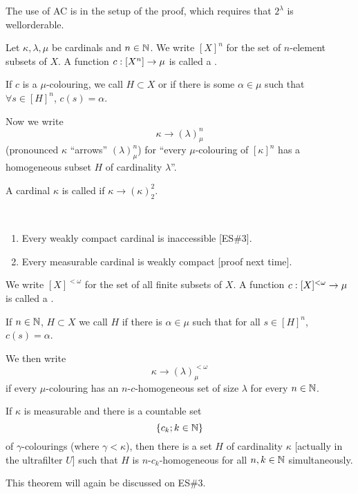 \documentclass[]{article}
\newcommand{\lom}{{<\omega}}
\begin{document}
\begin{remark*}
    The use of AC is in the setup of the proof, which requires that $2^\lambda$ is wellorderable.
\end{remark*}

\begin{defin*}
    Let $\kappa,\lambda,\mu$ be cardinals and $n \in \mathbb{N}$. We write $[X]^n$ for the set of $n$-element subsets of $X$. A function $c : [X^n] \rightarrow \mu$ is called a .

    If $c$ is a $\mu$-colouring, we call $H\subset X$  or  if there is some $ \alpha \in \mu$ such that $\forall s \in [H]^n$, $c(s) = \alpha$.

    Now we write $$\kappa \rightarrow (\lambda)^n_\mu$$ (pronounced $\kappa$ ``arrows'' $(\lambda)^n_\mu$) for ``every $\mu$-colouring of $[\kappa]^n$ has a homogeneous subset $H$ of cardinality $\lambda$''.
\end{defin*}

\begin{defin*}
    A cardinal $\kappa$ is called  if $\kappa \rightarrow (\kappa)^2_2$.
\end{defin*}
\begin{remark*}[Facts]\ 
    \begin{enumerate}[label = (\arabic*)]
        \item Every weakly compact cardinal is inaccessible [ES\#3].
        \item Every measurable cardinal is weakly compact [proof next time].
    \end{enumerate}
\end{remark*}

\begin{defin*}
    We write $[X]^\lom$ for the set of all finite subsets of $X$. A function $c : [X]^\lom \ra\mu$ is called a .

    If $n \in \mathbb{N}$, $H\subset X$ we call $H$  if there is $\alpha \in \mu$ such that for all $s \in [H]^n$, $c(s) = \alpha$.

    We then write $$\kappa \rightarrow (\lambda)^\lom_\mu$$ if every $\mu$-colouring has an $n$-$c$-homogeneous set of size $\lambda$ for every $n \in \mathbb{N}$.
\end{defin*}

\begin{theorem*}
    If $\kappa$ is measurable and there is a countable set $$\{c_k;k \in \mathbb{N}\}$$ of $\gamma$-colourings (where $\gamma < \kappa$), then there is a set $H$ of cardinality $\kappa$ [actually in the ultrafilter $U$] such that $H$ is $n$-$c_k$-homogeneous for all $n,k\in \mathbb{N}$ simultaneously.
\end{theorem*}
This theorem will again be discussed on ES\#3.
\end{document}
